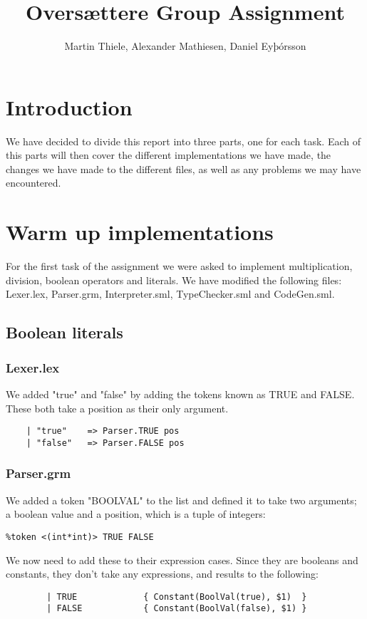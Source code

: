 \documentclass[12pt]{article}
\title{Oversættere Group Assignment}
\author{Martin Thiele, Alexander Mathiesen, Daniel Eyþórsson}
\date{\parbox{\linewidth}{\centering%
  20. december 2015\endgraf\bigskip
  Studienummer: mqn507, pkq530, kzs773\endgraf\medskip
  Email: <Studienummer> @alumni.ku.dk\endgraf}}
\begin{document}
\maketitle

\section{Introduction}
We have decided to divide this report into three parts, one for each task. Each of this parts will then cover the different implementations we have made, the changes we have made to the different files, as well as any problems we may have encountered.
\section{Warm up implementations}
For the first task of the assignment we were asked to implement multiplication, division, boolean operators and literals. We have modified the following files: Lexer.lex, Parser.grm, Interpreter.sml, TypeChecker.sml and CodeGen.sml.
\subsection{Boolean literals}
\subsubsection{Lexer.lex}

We added "true" and "false" by adding the tokens known as TRUE and FALSE. These both take a position as their only argument.
\begin{verbatim}
    | "true"    => Parser.TRUE pos
    | "false"   => Parser.FALSE pos
\end{verbatim}
\subsubsection{Parser.grm}
We added a token "BOOLVAL" to the list and defined it to take two arguments; a boolean value and a position, which is a tuple of integers:
\begin{verbatim}
%token <(int*int)> TRUE FALSE
\end{verbatim}

We now need to add these to their expression cases. Since they are booleans and constants, they don't take any expressions, and results to the following:
\begin{verbatim}
        | TRUE             { Constant(BoolVal(true), $1)  }
        | FALSE            { Constant(BoolVal(false), $1) }
\end{verbatim}
\end{document}
